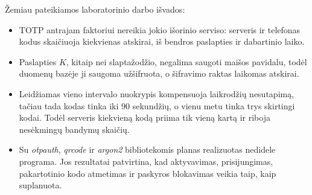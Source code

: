 \label{sec:isvados}

Žemiau pateikiamos laboratorinio darbo išvados:
\begin{itemize}
    \item TOTP antrajam faktoriui nereikia jokio išorinio serviso: serveris ir telefonas kodus skaičiuoja kiekvienas atskirai, iš bendros paslapties ir dabartinio laiko.
    \item Paslapties $K$, kitaip nei slaptažodžio, negalima saugoti maišos pavidalu, todėl duomenų bazėje ji saugoma užšifruota, o šifravimo raktas laikomas atskirai.
    \item Leidžiamas vieno intervalo nuokrypis kompensuoja laikrodžių nesutapimą, tačiau tada kodas tinka iki $90$ sekundžių, o vienu metu tinka trys skirtingi kodai. Todėl serveris kiekvieną kodą priima tik vieną kartą ir riboja nesėkmingų bandymų skaičių.
    \item Su \textit{otpauth}, \textit{qrcode} ir \textit{argon2} bibliotekomis planas realizuotas nedidele programa. Jos rezultatai patvirtina, kad aktyvavimas, prisijungimas, pakartotinio kodo atmetimas ir paskyros blokavimas veikia taip, kaip suplanuota.
\end{itemize}
